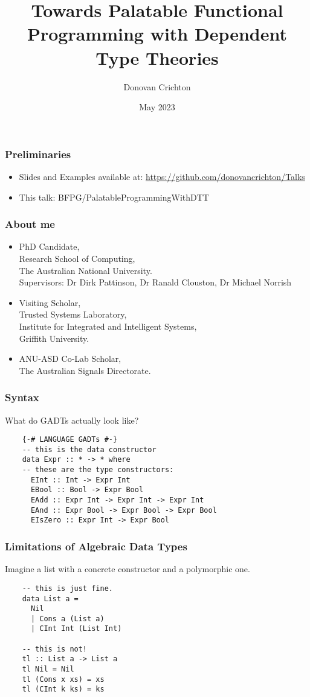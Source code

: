 \documentclass[hyperref={colorlinks = true,linkcolor = blue, citecolor = blue, urlcolor = blue}]{beamer}
\title{Towards Palatable Functional Programming with 
       Dependent Type Theories}
\author{Donovan Crichton}
\date{May 2023}
\begin{document}
 
\frame{\titlepage}

\begin{frame}[fragile]
  \frametitle{Preliminaries}
  \begin{itemize}
  \item Slides and Examples available at:
    \url{https://github.com/donovancrichton/Talks}
  \item This talk: BFPG/PalatableProgrammingWithDTT
  \end{itemize}
\end{frame}

\begin{frame}[fragile]
\frametitle{About me}
\begin{itemize}
  \item PhD Candidate, 
        \\ Research School of Computing, 
        \\ The Australian National University. \\
        \small{Supervisors: Dr Dirk Pattinson, Dr Ranald Clouston, 
               Dr Michael Norrish}
  \item Visiting Scholar, 
        \\ Trusted Systems Laboratory, 
        \\ Institute for Integrated and Intelligent Systems, 
        \\ Griffith University.
  \item ANU-ASD Co-Lab Scholar, 
        \\The Australian Signals Directorate.
\end{itemize}
\end{frame}

\begin{frame}[fragile]
  \frametitle{Syntax}
  What do GADTs actually look like?
  \begin{verbatim}
    {-# LANGUAGE GADTs #-}
    -- this is the data constructor
    data Expr :: * -> * where
    -- these are the type constructors:
      EInt :: Int -> Expr Int
      EBool :: Bool -> Expr Bool
      EAdd :: Expr Int -> Expr Int -> Expr Int
      EAnd :: Expr Bool -> Expr Bool -> Expr Bool
      EIsZero :: Expr Int -> Expr Bool
  \end{verbatim}
\end{frame}

\begin{frame}[fragile]
  \frametitle{Limitations of Algebraic Data Types}
  Imagine a list with a concrete constructor and a polymorphic one.
  \begin{verbatim}
    -- this is just fine.
    data List a =
      Nil
      | Cons a (List a)
      | CInt Int (List Int)

    -- this is not! 
    tl :: List a -> List a
    tl Nil = Nil
    tl (Cons x xs) = xs
    tl (CInt k ks) = ks
  \end{verbatim}
\end{frame}
\end{document}
